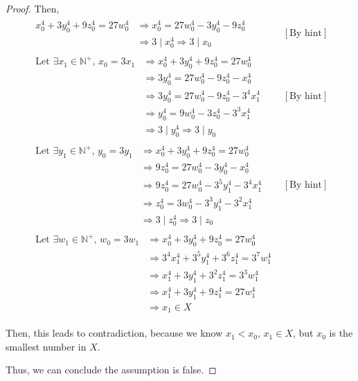 \documentclass[12pt]{article}
\begin{document}
\begin{mdframed}
\begin{proof}
    Then,
    \setcounter{equation}{0}
    \begin{align}
        \begin{split}
        x_0^4 + 3y_0^4 + 9z_0^4 = 27w_0^4 &\Rightarrow x_0^4 = 27w_0^4 - 3y_0^4 - 9z_0^4\\
        & \Rightarrow 3 \mid x_0^4 \Rightarrow 3 \mid x_0
        \end{split} & [\text{By hint}]\\[1em]
        \begin{split}
        \text{Let $\exists x_1 \in \mathbb{N}^+$, $x_0 = 3x_1$} &\Rightarrow x_0^4 + 3y_0^4 + 9z_0^4 = 27w_0^4\\
        &\Rightarrow 3y_0^4 = 27w_0^4 - 9z_0^4 - x_0^4\\
        &\Rightarrow 3y_0^4 = 27w_0^4 - 9z_0^4 - 3^4x_1^4\\
        &\Rightarrow y_0^4 = 9w_0^4 - 3z_0^4 - 3^3x_1^4\\
        &\Rightarrow 3 \mid y_0^4 \Rightarrow 3 \mid y_0
        \end{split} & [\text{By hint}]\\[1em]
        \begin{split}
        \text{Let $\exists y_1 \in \mathbb{N}^+$, $y_0 = 3y_1$} &\Rightarrow x_0^4 + 3y_0^4 + 9z_0^4 = 27w_0^4\\
        &\Rightarrow 9z_0^4 = 27w_0^4 - 3y_0^4 - x_0^4\\
        &\Rightarrow 9z_0^4 = 27w_0^4 - 3^5y_1^4 - 3^4x_1^4\\
        &\Rightarrow z_0^4 = 3w_0^4 - 3^3y_1^4 - 3^2x_1^4\\
        &\Rightarrow 3 \mid z_0^4 \Rightarrow 3 \mid z_0
        \end{split} & [\text{By hint}]\\[1em]
        \begin{split}
        \text{Let $\exists w_1 \in \mathbb{N}^+$, $w_0 = 3w_1$} &\Rightarrow x_0^4 + 3y_0^4 + 9z_0^4 = 27w_0^4\\
        &\Rightarrow 3^4x_1^4 + 3^5y_1^4 + 3^6z_1^4 = 3^7w_1^4\\
        &\Rightarrow x_1^4 + 3y_1^4 + 3^2z_1^4 = 3^3w_1^4\\
        &\Rightarrow x_1^4 + 3y_1^4 + 9z_1^4 = 27w_1^4\\
        &\Rightarrow x_1 \in X
        \end{split}
    \end{align}

    \bigskip

    Then, this leads to contradiction, because we know $x_1 < x_0$, $x_1 \in X$,
    but $x_0$ is the smallest number in $X$.

    \bigskip

    Thus, we can conclude the assumption is false.

    \end{proof}

\end{mdframed}
\end{document}
